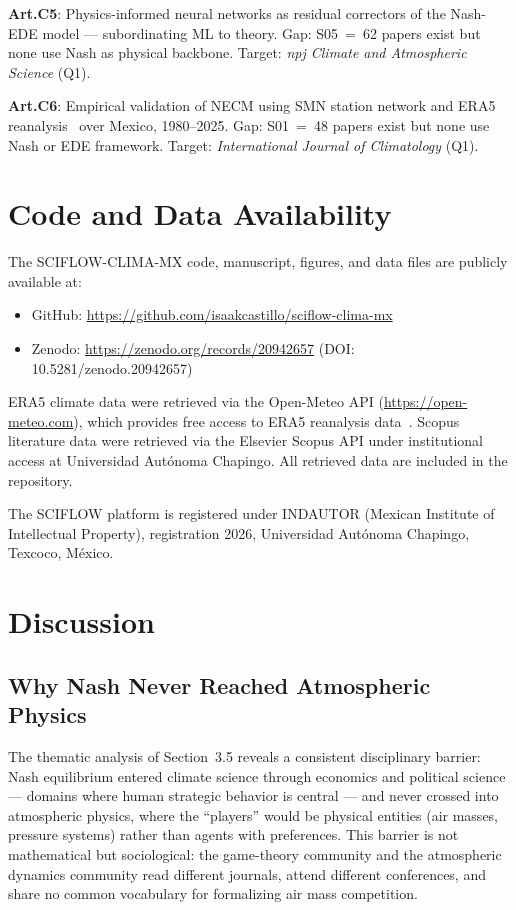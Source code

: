 \documentclass[gmd, manuscript]{copernicus}
\begin{document}
\textbf{Art.C5}: Physics-informed neural networks as residual correctors
of the Nash-EDE model — subordinating ML to theory.
Gap: S05~=~62 papers exist but none use Nash as physical backbone.
Target: \textit{npj Climate and Atmospheric Science} (Q1).

\textbf{Art.C6}: Empirical validation of NECM using SMN station
network and ERA5 reanalysis~\citep{Hersbach2020, Munoz2021} over Mexico, 1980--2025.
Gap: S01~=~48 papers exist but none use Nash or EDE framework.
Target: \textit{International Journal of Climatology} (Q1).



\section{Code and Data Availability}

The SCIFLOW-CLIMA-MX code, manuscript, figures, and data files
are publicly available at:

\begin{itemize}
\item GitHub: \url{https://github.com/isaakcastillo/sciflow-clima-mx}
\item Zenodo: \url{https://zenodo.org/records/20942657} (DOI: 10.5281/zenodo.20942657)
\end{itemize}

ERA5 climate data were retrieved via the Open-Meteo API
(\url{https://open-meteo.com}), which provides free access to
ERA5 reanalysis data~\citep{Hersbach2020}.
Scopus literature data were retrieved via the Elsevier Scopus API
under institutional access at Universidad Autónoma Chapingo.
All retrieved data are included in the repository.

The SCIFLOW platform is registered under INDAUTOR (Mexican
Institute of Intellectual Property), registration 2026,
Universidad Autónoma Chapingo, Texcoco, México.

\section{Discussion}

\subsection{Why Nash Never Reached Atmospheric Physics}

The thematic analysis of Section~3.5 reveals a consistent disciplinary
barrier: Nash equilibrium entered climate science through economics and
political science — domains where human strategic behavior is central —
and never crossed into atmospheric physics, where the ``players'' would
be physical entities (air masses, pressure systems) rather than agents
with preferences. This barrier is not mathematical but sociological:
the game-theory community and the atmospheric dynamics community read
different journals, attend different conferences, and share no common
vocabulary for formalizing air mass competition.
\end{document}
